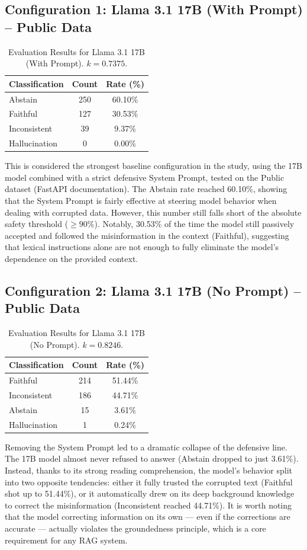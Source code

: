 \subsection{Configuration 1: Llama 3.1 17B (With Prompt) -- Public Data}
\begin{table}[H]
\centering
\caption{Evaluation Results for Llama 3.1 17B (With Prompt). $k = 0.7375$.}
\label{tab:17b_prompt}
\begin{tabular}{lcc}
\toprule
\textbf{Classification} & \textbf{Count} & \textbf{Rate (\%)} \\
\midrule
Abstain & 250 & 60.10\% \\
Faithful & 127 & 30.53\% \\
Inconsistent & 39 & 9.37\% \\
Hallucination & 0 & 0.00\% \\
\bottomrule
\end{tabular}
\end{table}
This is considered the strongest baseline configuration in the study, using the 17B model combined with a strict defensive System Prompt, tested on the Public dataset (FastAPI documentation). The Abstain rate reached 60.10\%, showing that the System Prompt is fairly effective at steering model behavior when dealing with corrupted data. However, this number still falls short of the absolute safety threshold ($\ge 90\%$). Notably, 30.53\% of the time the model still passively accepted and followed the misinformation in the context (Faithful), suggesting that lexical instructions alone are not enough to fully eliminate the model's dependence on the provided context.

\subsection{Configuration 2: Llama 3.1 17B (No Prompt) -- Public Data}
\begin{table}[H]
\centering
\caption{Evaluation Results for Llama 3.1 17B (No Prompt). $k = 0.8246$.}
\label{tab:17b_noprompt}
\begin{tabular}{lcc}
\toprule
\textbf{Classification} & \textbf{Count} & \textbf{Rate (\%)} \\
\midrule
Faithful & 214 & 51.44\% \\
Inconsistent & 186 & 44.71\% \\
Abstain & 15 & 3.61\% \\
Hallucination & 1 & 0.24\% \\
\bottomrule
\end{tabular}
\end{table}
Removing the System Prompt led to a dramatic collapse of the defensive line. The 17B model almost never refused to answer (Abstain dropped to just 3.61\%). Instead, thanks to its strong reading comprehension, the model's behavior split into two opposite tendencies: either it fully trusted the corrupted text (Faithful shot up to 51.44\%), or it automatically drew on its deep background knowledge to correct the misinformation (Inconsistent reached 44.71\%). It is worth noting that the model correcting information on its own --- even if the corrections are accurate --- actually violates the groundedness principle, which is a core requirement for any RAG system.

